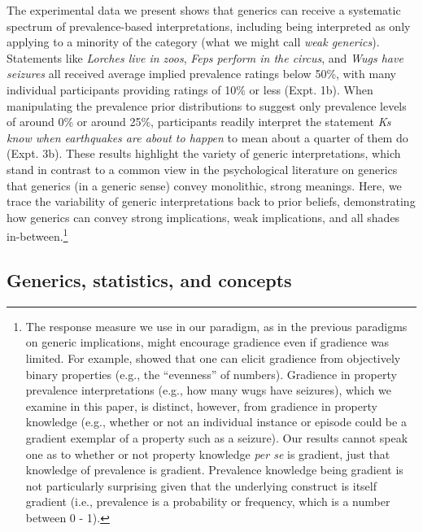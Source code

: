 \documentclass[floatsintext,doc]{apa6}
\let\rmarkdownfootnote\footnote%
\def\footnote{\protect\rmarkdownfootnote}
\begin{document}
%
The experimental data we present shows that generics can receive a systematic spectrum of prevalence-based interpretations, including being interpreted as only applying to a minority of the category (what we might call \emph{weak generics}). 
Statements like \emph{Lorches live in zoos}, \emph{Feps perform in the circus}, and \emph{Wugs have seizures} all received average implied prevalence ratings below 50\%, with many individual participants providing ratings of 10\% or less (Expt. 1b).
When manipulating the prevalence prior distributions to suggest only prevalence levels of around 0\% or around 25\%, participants readily interpret the statement \emph{Ks know when earthquakes are about to happen} to mean about a quarter of them do (Expt. 3b).
These results highlight the variety of generic interpretations, which stand in contrast to a common view in the psychological literature on generics that generics (in a generic sense) convey monolithic, strong meanings.
Here, we trace the variability of generic interpretations back to prior beliefs, demonstrating how generics can convey strong implications, weak implications, and all shades in-between.\footnote{
The response measure we use in our paradigm, as in the previous paradigms on generic implications, might encourage gradience even if gradience was limited.
For example,  showed that one can elicit gradience from objectively binary properties (e.g., the ``evenness'' of numbers).
Gradience in property prevalence interpretations (e.g., how many wugs have seizures), which we examine in this paper, is distinct, however, from gradience in property knowledge (e.g., whether or not an individual instance or episode could be a gradient exemplar of a property such as a seizure). Our results cannot speak one as to whether or not property knowledge \emph{per se} is gradient, just that knowledge of prevalence is gradient. Prevalence knowledge being gradient is not particularly surprising given that the underlying construct is itself gradient (i.e., prevalence is a probability or frequency, which is a number between 0 - 1). 
}

\subsection{Generics, statistics, and concepts}
\end{document}
